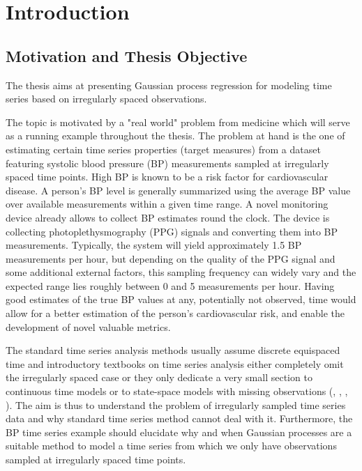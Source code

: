 \chapter{Introduction}\label{ch:introduction}


\section{Motivation and Thesis Objective}\label{sec:thesis-objective}

The thesis aims at presenting Gaussian process regression for modeling time
series based on irregularly spaced observations.

The topic is motivated by a "real world" problem from medicine which will
serve as a running example throughout the thesis.
%
The problem at hand is the one of estimating certain time series properties (target measures) from a dataset
featuring systolic blood pressure (BP) measurements sampled at irregularly spaced time points.
High BP is known to be a risk factor for cardiovascular disease.
A person’s BP level is generally summarized using the average BP value over available measurements within a given time range.
A novel monitoring device already allows to collect BP estimates round the clock.
The device is collecting photoplethysmography (PPG) signals and converting them into BP measurements.
Typically, the system will yield approximately 1.5 BP measurements per hour, but depending on the quality of the PPG signal and some additional external factors,
this sampling frequency can widely vary and the expected range lies roughly between 0 and 5 measurements per hour.
Having good estimates of the true BP values at any, potentially not observed, time would allow for a better estimation
of the person’s cardiovascular risk, and enable the development of novel valuable metrics.

The standard time series analysis methods usually assume discrete equispaced
time and introductory textbooks on time series analysis either completely omit
the irregularly spaced case or they only dedicate
a very small section to continuous time models or to state-space models
with missing observations (\citeauthor{brockwell_time_1991}, \citeauthor{brockwell_introduction_2016},
\citeauthor{cryer_time_2008}, \citeauthor{chatfield_analysis_2003}).
The aim is thus to understand the problem of irregularly sampled time series data
and why standard time series method cannot deal with it.
Furthermore, the BP time series example should elucidate why and when Gaussian processes are a
suitable method to model a time series from which we only have observations sampled at
irregularly spaced time points.


